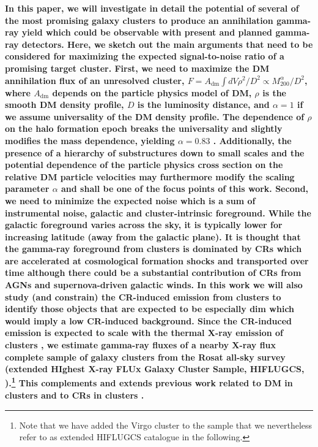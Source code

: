 \documentclass[10pt,aps,pra,reprint,amsmath,amsfonts,amssymb,showpacs,nofootinbib,floatfix]{revtex4-1}
\def\C#1{{\bf #1}}
\newcommand{\rmn}{\mathrm}
\newcommand{\mvir}{M_{200}}
\begin{document}
\C{In this paper, we will investigate in detail the potential of
  several of the most promising galaxy clusters to produce an
  annihilation gamma-ray yield which could be observable with present
  and planned gamma-ray detectors. Here, we sketch out the main
  arguments that need to be considered for maximizing the expected
  signal-to-noise ratio of a promising target cluster. First, we need
  to maximize the DM annihilation flux of an unresolved cluster,
  $F=A_\rmn{dm} \int dV \rho^2 / D^2 \propto \mvir^\alpha/D^2$, where
  $A_\rmn{dm}$ depends on the particle physics model of DM, $\rho$ is
  the smooth DM density profile, $D$ is the luminosity distance, and
  $\alpha=1$ if we assume universality of the DM density profile. The
  dependence of $\rho$ on the halo formation epoch breaks the
  universality and slightly modifies the mass dependence, yielding
  $\alpha=0.83$ \cite{2009PhRvL.103r1302P}. Additionally, the presence
  of a hierarchy of substructures down to small scales
  \cite{2008Natur.456...73S} and the potential dependence of the
  particle physics cross section on the relative DM particle
  velocities \cite{ArkaniHamed:2008qn} may furthermore modify the
  scaling parameter $\alpha$ and shall be one of the focus points of
  this work. Second, we need to minimize the expected noise which is a
  sum of instrumental noise, galactic and cluster-intrinsic
  foreground. While the galactic foreground varies across the sky, it
  is typically lower for increasing latitude (away from the galactic
  plane). It is thought that the gamma-ray foreground from clusters is
  dominated by CRs which are accelerated at cosmological formation
  shocks and transported over time although there could be a
  substantial contribution of CRs from AGNs and supernova-driven
  galactic winds. In this work we will also study (and constrain) the
  CR-induced emission from clusters to identify those objects that are
  expected to be especially dim which would imply a low CR-induced
  background.  Since the CR-induced emission is expected to scale with
  the thermal X-ray emission of clusters \cite{2004A&A...413...17P},
  we estimate gamma-ray fluxes of a nearby X-ray flux complete sample
  of galaxy clusters from the Rosat all-sky survey (extended HIghest
  X-ray FLUx Galaxy Cluster Sample, HIFLUGCS,
  \cite{2002ApJ...567..716R,2007A&A...466..805C}).\footnote{Note that
    we have added the Virgo cluster to the sample that we nevertheless
    refer to as extended HIFLUGCS catalogue in the following.}  This
  complements and extends previous work related to DM in clusters
  \cite{2006A&A...455...21C,2009PhRvD..80b3005J,2011arXiv1104.3530S,2011ApJ...726L...6C,2011arXiv1110.1529H}
  and to CRs in clusters
  \cite{2010MNRAS.409..449P,2011MNRAS.410..127B,2008MNRAS.385.1211P,2009JCAP...08..002K,2010MNRAS.407.1565D}.}
\end{document}
